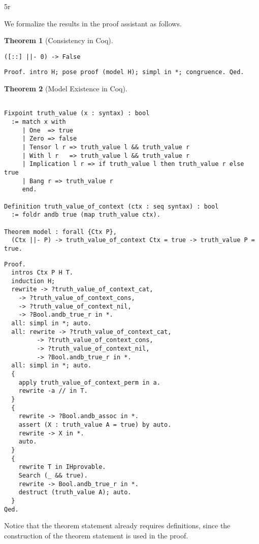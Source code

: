 5r\documentclass{article}
\newtheorem{thm}{Theorem}
\theoremstyle{definition}
\begin{document}
We formalize the results in the proof assistant as follows. 

\setcounter{savethm}{\value{thm}}
\setcounter{thm}{\value{thmconsistency}}
\begin{thm}[Consistency in Coq]
\begin{verbatim}
([::] ||- 0) -> False
\end{verbatim}
\end{thm}
\noindent
\begin{verbatim}
Proof. intro H; pose proof (model H); simpl in *; congruence. Qed.
\end{verbatim}

\setcounter{thm}{\value{thmexistence}}
\begin{thm}[Model Existence in Coq]
\begin{verbatim}

Fixpoint truth_value (x : syntax) : bool
  := match x with
     | One  => true
     | Zero => false
     | Tensor l r => truth_value l && truth_value r
     | With l r   => truth_value l && truth_value r
     | Implication l r => if truth_value l then truth_value r else true
     | Bang r => truth_value r
     end.

Definition truth_value_of_context (ctx : seq syntax) : bool
  := foldr andb true (map truth_value ctx).
  
Theorem model : forall {Ctx P},
  (Ctx ||- P) -> truth_value_of_context Ctx = true -> truth_value P = true.
\end{verbatim}
\end{thm}
\begin{verbatim}
Proof.
  intros Ctx P H T.
  induction H;
  rewrite -> ?truth_value_of_context_cat,
    -> ?truth_value_of_context_cons,
    -> ?truth_value_of_context_nil,
    -> ?Bool.andb_true_r in *.
  all: simpl in *; auto.  
  all: rewrite -> ?truth_value_of_context_cat,
         -> ?truth_value_of_context_cons,
         -> ?truth_value_of_context_nil,
         -> ?Bool.andb_true_r in *.
  all: simpl in *; auto.  
  {
    apply truth_value_of_context_perm in a.
    rewrite -a // in T.
  }
  {
    rewrite -> ?Bool.andb_assoc in *.    
    assert (X : truth_value A = true) by auto.
    rewrite -> X in *.
    auto.
  }
  {
    rewrite T in IHprovable.
    Search (_ && true).
    rewrite -> Bool.andb_true_r in *.
    destruct (truth_value A); auto.
  }
Qed.
\end{verbatim}

\setcounter{thm}{\value{savethm}}

Notice that the theorem statement already requires definitions, since the construction of the theorem statement is used in the proof. 
\end{document}
